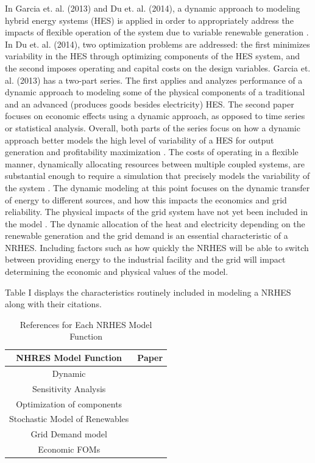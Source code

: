 \documentclass{article}                                                                           %
\begin{document}
\begin{linenumbers}
In Garcia et. al. (2013) and Du et. al. (2014), a dynamic approach to modeling hybrid energy systems (HES) is applied in order to appropriately address the impacts of flexible operation of the system due to variable renewable generation \cite{Garcia2013, Du2014}. In Du et. al. (2014), two optimization problems are addressed: the first minimizes variability in the HES through optimizing components of the HES system, and the second imposes operating and capital costs on the design variables. Garcia et. al. (2013) has a two-part series. The first applies and analyzes performance of a dynamic approach to modeling some of the physical components of a traditional and an advanced (produces goods besides electricity) HES. The second paper focuses on economic effects using a dynamic approach, as opposed to time series or statistical analysis. Overall, both parts of the series focus on how a dynamic approach better models the high level of variability of a HES for output generation and profitability maximization \cite{Garcia2013}. The costs of operating in a flexible manner, dynamically allocating resources between multiple coupled systems, are substantial enough to require a simulation that precisely models the variability of the system \cite{Garcia2013, Shropshire2011, Locatelli2015}. The dynamic modeling at this point focuses on the dynamic transfer of energy to different sources, and how this impacts the economics and grid reliability. The physical impacts of the grid system have not yet been included in the model \cite{Harrison2016}.  The dynamic allocation of the heat and electricity depending on the renewable generation and the grid demand is an essential characteristic of a NRHES.  Including factors such as how quickly the NRHES will be able to switch between providing energy to the industrial facility and the grid will impact determining the economic and physical values of the model.

Table I displays the characteristics routinely included in modeling a NRHES along with their citations.

\begin{table}[h!]
\centering
\caption{References for Each NRHES Model Function}
\begin{tabular}{ ||c | c|| }
 \hline
 NHRES Model Function & Paper \\ [0.5ex]
 \hline \hline
 Dynamic & \cite{Garcia2013, Du2014, Kazimi, Garcia2016}\\
 \hline
 Sensitivity Analysis & \cite{Shropshire2011, Rehman2010, Adaramola2014, Chen2016}\\
 \hline
 Optimization of components & \cite{Chen2016,Ozcan2016, Forsberg2009,Garcia2015,Aumeier2011}\\
 \hline
 Stochastic Model of Renewables & \cite{Rabiti2015, Garcia2016,Locatelli2015}\\
 \hline
 Grid Demand model & \cite{Forsberg2013, Garcia2016,Garcia2013,Ruth2014,Chen2016}\\
 \hline
  Economic FOMs & \cite{Garcia2016,Chen2016,Rabiti2015,Epiney2016,Bragg-Sitton2014}\\
 \hline
\end{tabular}
\label{table:1}
\end{table}


\end{linenumbers}
\end{document}
